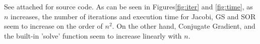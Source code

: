 \documentclass{article}
\begin{document}
See attached for source code.
As can be seen in Figures\ref{fig:iter} and \ref{fig:time}, as $n$ increases, 
the number of iterations and execution time for Jacobi, GS and SOR seem to increase
on the order of $n^2$.  On the other hand, Conjugate Gradient, and the built-in 
'solve' function seem to increase linearly with $n$.
\begin{figure}[htb]
\end{figure}
\end{document}
